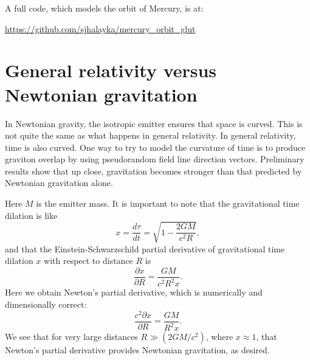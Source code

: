 \documentclass[12pt]{article}
\begin{document}
A full code, which models the orbit of Mercury, is at:

\url{https://github.com/sjhalayka/mercury_orbit_glut}




\section{General relativity versus Newtonian gravitation}

In Newtonian gravity, the isotropic emitter ensures that space is curved.
This is not quite the same as what happens in general relativity.
In general relativity, time is also curved.
One way to try to model the curvature of time is to produce graviton overlap by using pseudorandom field line direction vectors.
Preliminary results show that up close, gravitation becomes stronger than that predicted by Newtonian gravitation alone.

Here $M$ is the emitter mass.
It is important to note that the gravitational time dilation is like
\begin{equation}
x = \frac{d\tau}{dt} = \sqrt{1 - \frac{2GM}{c^2 R}},
\end{equation}
and that the Einstein-Schwarzschild partial derivative of gravitational time dilation $x$ with respect to distance $R$ is
\begin{equation}
\frac{\partial x}{\partial R}  = \frac{GM}{c^2 R^2 x}.
\end{equation}
Here we obtain Newton's partial derivative, which is numerically and dimensionally correct:
\begin{equation}
\frac{ c^2 \partial x}{\partial R} = \frac{GM}{R^2 x}.
\end{equation}
We see that for very large distances $R \gg (2GM/c^2)$, where $x \approx 1$, that Newton's partial derivative provides Newtonian gravitation, as desired.
\end{document}
